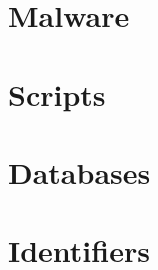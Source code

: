\documentclass{article}
\newcommand\importsection[2]{
 \section{#1}
 
}
\begin{document}




\importsection{Malware}{malware.tex}
\importsection{Scripts}{scripts.tex}
\importsection{Databases}{databases.tex}
\importsection{Identifiers}{identifiers.tex}
\end{document}
